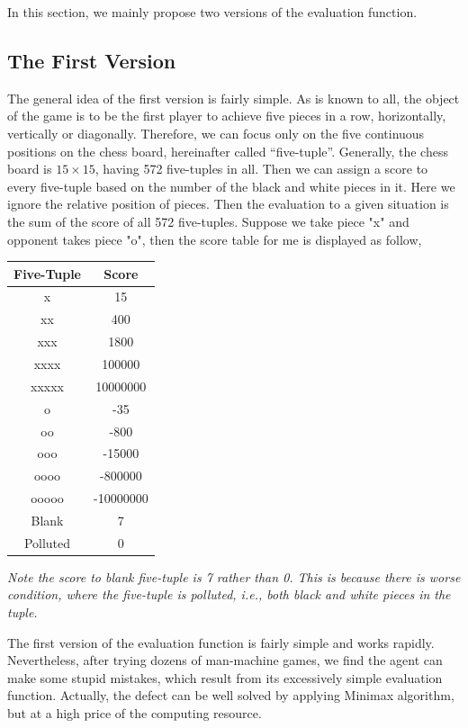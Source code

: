 \documentclass[12pt,a4paper]{article}
\begin{document}
In this section, we mainly propose two versions of the evaluation function.

\subsection{The First Version}
The general idea of the first version is fairly simple. As is known to all, the object of the game is to be the first player to achieve five pieces in a row, horizontally, vertically or diagonally. Therefore, we can focus only on the five continuous positions on the chess board, hereinafter called ``five-tuple''. Generally, the chess board is $15\times 15$, having 572 five-tuples in all. Then we can assign a score to every five-tuple based on the number of the black and white pieces in it. Here we ignore the relative position of pieces. Then the evaluation to a given situation is the sum of the score of all 572 five-tuples. Suppose we take piece "x" and opponent takes piece "o", then the score table for me is displayed as follow,
\begin{table}[h]
\centering
\begin{tabular}{c|c}
\hline
Five-Tuple&Score \\
\hline
x&15\\
xx&400\\
xxx&1800\\
xxxx&100000\\
xxxxx&10000000\\
o&-35\\
oo&-800\\
ooo&-15000\\
oooo&-800000\\
ooooo&-10000000\\
Blank&7\\
Polluted&0\\
\hline
\end{tabular}
\end{table}

\noindent\begin{small}\emph{Note the score to blank five-tuple is 7 rather than 0. This is because there is worse condition, where the five-tuple is polluted, i.e., both black and white pieces in the tuple.}\end{small}

The first version of the evaluation function is fairly simple and works rapidly. Nevertheless, after trying dozens of man-machine games, we find the agent can make some stupid mistakes, which result from its excessively simple evaluation function. Actually, the defect can be well solved by applying Minimax algorithm, but at a high price of the computing resource.
\end{document}
